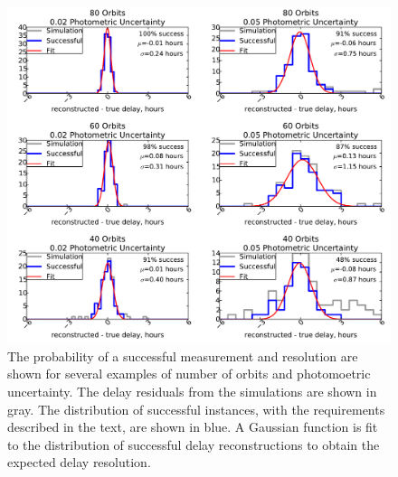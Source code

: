 \documentclass{emulateapj}
\begin{document}
\begin{figure}[t]
\begin{center}
\includegraphics[width=\linewidth]{./systematic_examples.pdf}
\caption{The probability of a successful measurement and resolution are shown for several examples of number of orbits and photomoetric uncertainty. The delay residuals from the simulations are shown in gray. The distribution of successful instances, with the requirements described in the text, are shown in blue. A Gaussian function is fit to the distribution of successful delay reconstructions to obtain the expected delay resolution.}\label{fig:volume}
\end{center}
\end{figure}
\end{document}
